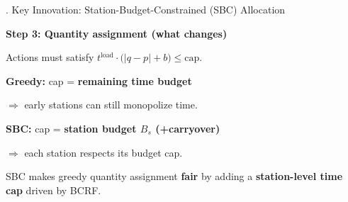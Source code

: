 \begin{block}{\fontsize{46}{54}. Key Innovation: Station-Budget-Constrained (SBC) Allocation}
\vspace{0.4cm}

{\fontsize{36}{44}\selectfont \textbf{Step 3: Quantity assignment (what changes)}}

\vspace{0.25cm}
{\fontsize{30}{36}\selectfont Actions must satisfy $t^\text{load}\cdot\bigl(|q-p|+b\bigr)\le \text{cap}$.}

\vspace{0.4cm}
\noindent
\begin{minipage}[t]{0.485\linewidth}
    \colorbox{AlertRed!8}{\parbox{0.97\linewidth}{\centering
        \vspace{0.35cm}
        {\fontsize{30}{36}\selectfont \textbf{Greedy:} cap = \colorbox{AlertRed!25}{\textbf{remaining time budget}}}

        \vspace{0.25cm}
        {\fontsize{28}{34}\selectfont $\Rightarrow$ early stations can still monopolize time.}
        \vspace{0.35cm}
    }}
\end{minipage}%
\hfill
\begin{minipage}[t]{0.485\linewidth}
    \colorbox{HKUGreen!8}{\parbox{0.97\linewidth}{\centering
        \vspace{0.35cm}
        {\fontsize{30}{36}\selectfont \textbf{SBC:} cap = \colorbox{HKUGreen!25}{\textbf{station budget $B_s$ (+carryover)}}}

        \vspace{0.25cm}
        {\fontsize{28}{34}\selectfont $\Rightarrow$ each station respects its budget cap.}
        \vspace{0.35cm}
    }}
\end{minipage}

\vspace{0.5cm}
\colorbox{AccentGold!18}{\parbox{0.98\linewidth}{
    \vspace{0.15cm}
    {\fontsize{32}{40}\selectfont SBC makes greedy quantity assignment \textbf{fair} by adding a \textbf{station-level time cap} driven by BCRF.}
    \vspace{0.15cm}
}}

\end{block}
